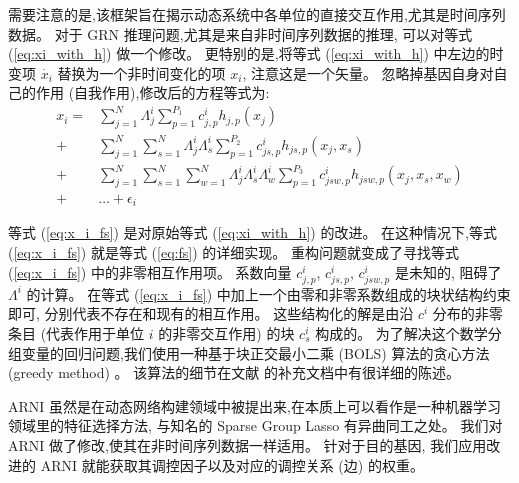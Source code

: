 需要注意的是,该框架旨在揭示动态系统中各单位的直接交互作用,尤其是时间序列数据。
对于 GRN 推理问题,尤其是来自非时间序列数据的推理,
可以对等式 (\ref{eq:xi_with_h}) 做一个修改。
更特别的是,将等式 (\ref{eq:xi_with_h}) 中左边的时变项 $\dot{x_i}$ 替换为一个非时间变化的项 $x_i$, 注意这是一个矢量。
忽略掉基因自身对自己的作用 (自我作用),修改后的方程等式为:
\begin{equation}
\label{eq:x_i_fs}
\begin{split}
   x_i = &\sum_{j=1}^{N} \Lambda^i_{j} \sum_{p=1}^{P_1} c^i_{j,p}h_{j,p}(x_j)\\ 
       + &\sum_{j=1}^{N} \sum_{s=1}^{N}\Lambda^i_{j}\Lambda^i_{s} \sum_{p=1}^{P_2} c^i_{js,p}h_{js,p}(x_j,x_s) \\ 
       + &\sum_{j=1}^{N} \sum_{s=1}^{N} \sum_{w=1}^{N}\Lambda^i_{j}\Lambda^i_{s}\Lambda^i_{w} \sum_{p=1}^{P_3} c^i_{jsw,p}h_{jsw,p}(x_j,x_s,x_w)\\
       +&\ldots + \epsilon_{i}
   \end{split}
\end{equation}

等式 (\ref{eq:x_i_fs}) 是对原始等式 (\ref{eq:xi_with_h}) 的改进。
在这种情况下,等式 (\ref{eq:x_i_fs}) 就是等式 (\ref{eq:fs}) 的详细实现。
重构问题就变成了寻找等式 (\ref{eq:x_i_fs}) 中的非零相互作用项。
系数向量 $c^i_{j,p}$, $c^i_{js,p}$, $c^i_{jsw,p}$ 是未知的,
阻碍了 $\Lambda^i$ 的计算。
在等式 (\ref{eq:x_i_fs}) 中加上一个由零和非零系数组成的块状结构约束即可,
分别代表不存在和现有的相互作用。
这些结构化的解是由沿 $c^i$ 分布的非零条目 (代表作用于单位 $i$ 的非零交互作用) 的块 $c^i_s$ 构成的。
为了解决这个数学分组变量的回归问题,我们使用一种基于块正交最小二乘 (BOLS) 算法的贪心方法 (greedy method) \cite{majumdar2009fast}。
该算法的细节在文献 \cite{casadiego2017model} 的补充文档中有很详细的陈述。

ARNI 虽然是在动态网络构建领域中被提出来,在本质上可以看作是一种机器学习领域里的特征选择方法,
与知名的 Sparse Group Lasso \cite{friedman2010note} 有异曲同工之处。
我们对 ARNI 做了修改,使其在非时间序列数据一样适用。
针对于目的基因, 我们应用改进的 ARNI 就能获取其调控因子以及对应的调控关系 (边) 的权重。

